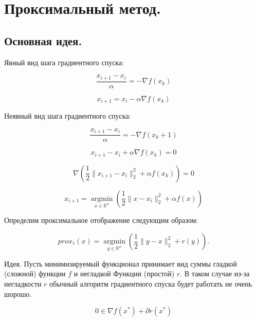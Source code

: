 \section*{Проксимальный метод.}

\subsection*{Основная идея.}

Явный вид шага градиентного спуска:

\begin{equation}
    \frac{x_{i+1}-x_i}\alpha=-\nabla f(x_k)
\end{equation}

\begin{equation}
    x_{i+1}=x_i-\alpha\nabla f(x_k)
\end{equation}

Неявный вид шага градиентного спуска:

\begin{equation}
    \frac{x_{i+1}-x_i}\alpha=-\nabla f(x_k+1)
\end{equation}

\begin{equation}
    x_{i+1}-x_i+\alpha\nabla f(x_k)=0
\end{equation}

\begin{equation}
    \nabla\left(\frac12\|x_{i+1}-x_i\|_2^2+\alpha f(x_k)\right)=0
\end{equation}

\begin{equation}
    x_{i+1}=\mathop{argmin}\limits_{x\in\mathbb{R}^n}\left(\frac12\|x-x_i\|_2^2+\alpha f(x)\right)
\end{equation}

Определим проксимальное отображение следующим образом:

\begin{equation}
    prox_r(x)=\mathop{argmin}\limits_{y\in\mathbb{R}^n}\left(\frac12\|y-x\|_2^2+r(y)\right).
\end{equation}

Идея. Пусть минимизируемый функционал принимает вид суммы гладкой (сложной) функции $f$ и негладкой Функции (простой) $r$. В таком случае из-за негладкости $r$ обычный алгоритм градиентного спуска будет работать не очень шорошо.

\begin{equation}
    0\in\nabla f(x^*)+\partial r(x^*)
\end{equation}

